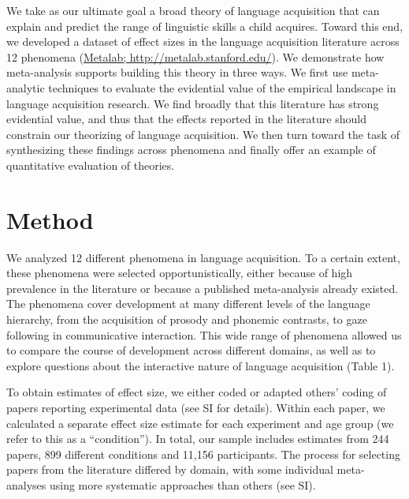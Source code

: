 \documentclass[english,floatsintext,man]{apa6}
\begin{document}
We take as our ultimate goal a broad theory of language acquisition that
can explain and predict the range of linguistic skills a child acquires.
Toward this end, we developed a dataset of effect sizes in the language
acquisition literature across 12 phenomena
(\href{http://metalab.stanford.edu}{Metalab;
http://metalab.stanford.edu/}). We demonstrate how meta-analysis
supports building this theory in three ways. We first use meta-analytic
techniques to evaluate the evidential value of the empirical landscape
in language acquisition research. We find broadly that this literature
has strong evidential value, and thus that the effects reported in the
literature should constrain our theorizing of language acquisition. We
then turn toward the task of synthesizing these findings across
phenomena and finally offer an example of quantitative evaluation of
theories.

\section{Method}\label{method}

We analyzed 12 different phenomena in language acquisition. To a certain
extent, these phenomena were selected opportunistically, either because
of high prevalence in the literature or because a published
meta-analysis already existed. The phenomena cover development at many
different levels of the language hierarchy, from the acquisition of
prosody and phonemic contrasts, to gaze following in communicative
interaction. This wide range of phenomena allowed us to compare the
course of development across different domains, as well as to explore
questions about the interactive nature of language acquisition (Table
1).

To obtain estimates of effect size, we either coded or adapted others'
coding of papers reporting experimental data (see SI for details).
Within each paper, we calculated a separate effect size estimate for
each experiment and age group (we refer to this as a
\enquote{condition}). In total, our sample includes estimates from 244
papers, 899 different conditions and 11,156 participants. The process
for selecting papers from the literature differed by domain, with some
individual meta-analyses using more systematic approaches than others
(see SI). \renewcommand{\arraystretch}{1.5}
\end{document}

